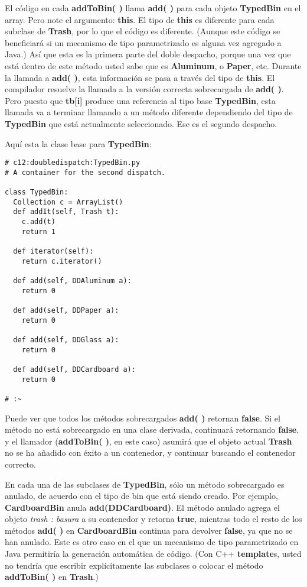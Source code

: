 El código en cada \textbf{addToBin( )} llama \textbf{add( )} para cada objeto \textbf{TypedBin} en el array. Pero note el argumento: \textbf{this}. El tipo de \textbf{this} es diferente para cada subclase de \textbf{Trash}, por lo que el código es diferente. (Aunque este código se beneficiará si un mecanismo de tipo parametrizado es alguna vez agregado a Java.) Así que esta es la primera parte del doble despacho, porque una vez que está dentro de este método usted sabe que es \textbf{Aluminum},  o \textbf{Paper}, etc. Durante la llamada a \textbf{add( )}, esta información se pasa a través del tipo de \textbf{this}. El compilador resuelve la llamada a la versión correcta sobrecargada de \textbf{add( )}. Pero puesto que \textbf{tb[i]} produce una referencia al tipo base \textbf{TypedBin}, esta llamada va a terminar llamando a un método diferente dependiendo del tipo de \textbf{TypedBin} que está actualmente seleccionado. Ese es el segundo despacho. \newline

Aquí esta la clase base para \textbf{TypedBin}:         \newline

\begin{lstlisting} 
# c12:doubledispatch:TypedBin.py 
# A container for the second dispatch. 

class TypedBin: 
  Collection c = ArrayList() 
  def addIt(self, Trash t): 
    c.add(t) 
    return 1 
    
  def iterator(self): 
    return c.iterator() 
    
  def add(self, DDAluminum a): 
    return 0 
    
  def add(self, DDPaper a): 
    return 0 
    
  def add(self, DDGlass a): 
    return 0 
    
  def add(self, DDCardboard a): 
    return 0 
    
# :~ 
\end{lstlisting}

Puede ver que todos los métodos sobrecargados \textbf{add( )} retornan  \textbf{false}. Si el método no está sobrecargado en una clase derivada, continuará retornando \textbf{false},  y el llamador (\textbf{addToBin( )}, en este caso)  asumirá que el objeto actual \textbf{Trash} no se ha añadido con éxito a un contenedor, y continuar buscando el contenedor correcto.         \newline

En cada una de las subclases de \textbf{TypedBin}, sólo un método sobrecargado es anulado, de acuerdo con el tipo de bin que está siendo creado. Por ejemplo, \textbf{CardboardBin} anula \textbf{add(DDCardboard)}. El método anulado agrega el objeto\textit{ trash : basura} a su contenedor y retorna \textbf{true}, mientras todo el resto de los métodos \textbf{add( )} en \textbf{CardboardBin} continua para devolver \textbf{false}, ya que no se han anulado. Este es otro caso en el que un mecanismo de tipo parametrizado en Java permitiría la generación automática de código. (Con C++ \textbf{template}s, usted no tendría que escribir explícitamente las subclases o colocar el método \textbf{addToBin( )} en \textbf{Trash}.)      \newline


